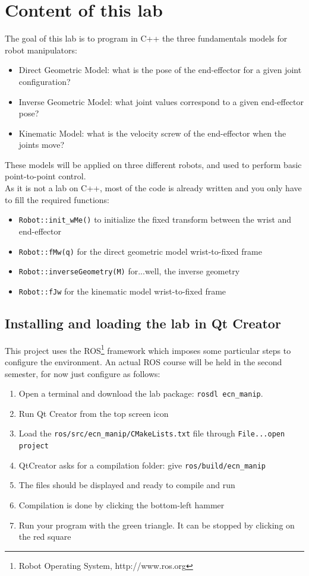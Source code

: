 \documentclass{ecnreport}
\begin{document}

\section{Content of this lab}

The goal of this lab is to program in C++ the three fundamentals models for robot manipulators:
\begin{itemize}
	\item Direct Geometric Model: what is the pose of the end-effector for a given joint configuration?
	\item Inverse Geometric Model: what joint values correspond to a given end-effector pose?
	\item Kinematic Model: what is the velocity screw of the end-effector when the joints move?
\end{itemize}
These models will be applied on three different robots, and used to perform basic point-to-point control.\\

As it is not a lab on C++, most of the code is already written and you only have to fill the required functions:
\begin{itemize}
	\item \texttt{Robot::init\_wMe()} to initialize the fixed transform between the wrist and end-effector
	\item \texttt{Robot::fMw(q)} for the direct geometric model wrist-to-fixed frame
	\item \texttt{Robot::inverseGeometry(M)} for...well, the inverse geometry
	\item \texttt{Robot::fJw} for the kinematic model wrist-to-fixed frame
\end{itemize}

\subsection{Installing and loading the lab in Qt Creator}

This project uses the ROS\footnote{Robot Operating System, http://www.ros.org} framework which imposes some particular steps to configure the environment. An actual ROS course will be held in the second semester, for now just configure as follows:

\begin{enumerate}
	\item Open a terminal and download the lab package: \texttt{rosdl ecn\_manip}.
	\item Run Qt Creator from the top screen icon
	\item Load the \texttt{ros/src/ecn\_manip/CMakeLists.txt} file through \texttt{File...open project}
	\item QtCreator asks for a compilation folder: give \texttt{ros/build/ecn\_manip}
	\item The files should be displayed and ready to compile and run
	\item Compilation is done by clicking the bottom-left hammer
	\item Run your program with the green triangle. It can be stopped by clicking on the red square
\end{enumerate}
\end{document}
